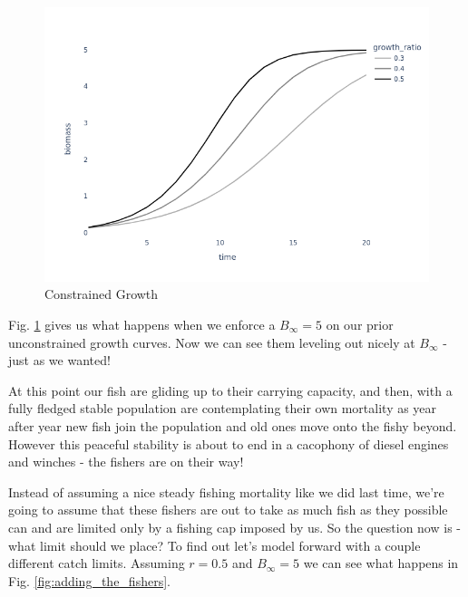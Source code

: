 \documentclass[11pt,a5paper]{book}
\begin{document}
\begin{figure}[h!] 
  \includegraphics[width=\linewidth]{notebooks/SurplusModels/capped_growth.png}
  \caption{Constrained Growth}
  \label{fig:constrained_growth}
\end{figure}

Fig. \ref{fig:constrained_growth} gives us what happens when we enforce a $B_\infty = 5$ on our prior unconstrained growth curves. Now we can see them leveling out nicely at $B_\infty$ - just as we wanted!
\newline

At this point our fish are gliding up to their carrying capacity, and then, with a fully fledged stable population are contemplating their own mortality as year after year new fish join the population and old ones move onto the fishy beyond. However this peaceful stability is about to end in a cacophony of diesel engines and winches - the fishers are on their way!
\newline

Instead of assuming a nice steady fishing mortality like we did last time, we're going to assume that these fishers are out to take as much fish as they possible can and are limited only by a fishing cap imposed by us. So the question now is - what limit should we place? To find out let's model forward with a couple different catch limits. Assuming $r=0.5$ and $B_\infty=5$ we can see what happens in Fig. \ref{fig:adding_the_fishers}.
\newline
\end{document}

